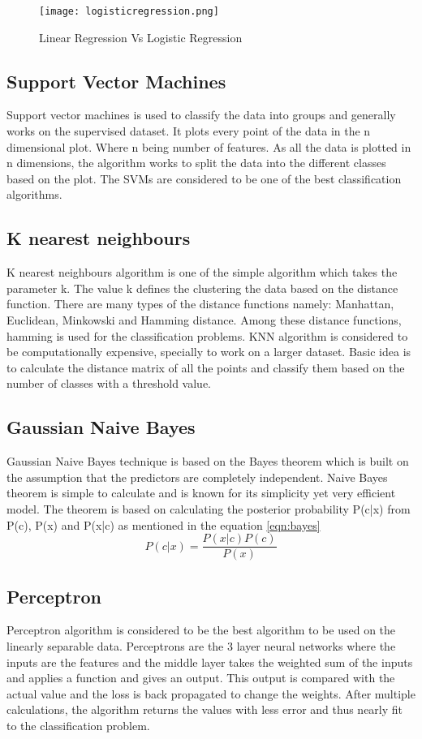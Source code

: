 \begin{figure}[h!]
	\center\texttt{[image: logisticregression.png]}
	\caption{Linear Regression Vs Logistic Regression}
	\label{fig:logisticregression}
\end{figure}
 
\subsection{Support Vector Machines}
Support vector machines is used to classify the data into groups and generally works on the supervised dataset. It plots every point of the data in the n  dimensional plot. Where n being number of features. As all the data is plotted in n dimensions, the algorithm works to split the data into the different classes based on the plot. The SVMs are considered to be one of the best classification algorithms.

\subsection{K nearest neighbours}
K nearest neighbours algorithm is one of the simple algorithm which takes the parameter k. The value k defines the clustering the data based on the distance function. There are many types of the distance functions namely: Manhattan, Euclidean, Minkowski and Hamming distance. Among these distance functions, hamming is used for the classification problems. KNN algorithm is considered to be computationally expensive, specially to work on a larger dataset. Basic idea is to calculate the distance matrix of all the points and classify them based on the number of classes with a threshold value.

\subsection{Gaussian Naive Bayes}
Gaussian Naive Bayes technique is based on the Bayes theorem which is built on the assumption that the predictors are completely independent. Naive Bayes theorem is simple to calculate and is known for its simplicity yet very efficient model. The theorem is based on calculating the posterior probability P(c|x) from P(c), P(x) and P(x|c) as mentioned in the equation \ref{eqn:bayes}
 \begin{equation}\label{eqn:bayes}
    P(c|x) = \frac {P(x|c) P(c)} {P(x)}
 \end{equation}

\subsection{Perceptron}
Perceptron algorithm is considered to be the best algorithm to be used on the linearly separable data. Perceptrons are the 3 layer neural networks where the inputs are the features and the middle layer takes the weighted sum of the inputs and applies a function and gives an output. This output is compared with the actual value and the loss is back propagated to change the weights. After multiple calculations, the algorithm returns the values with less error and thus nearly fit to the classification problem.

